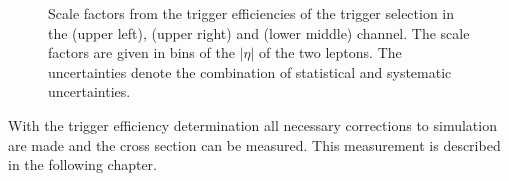 \begin{figure}[htbp!]
\begin{center}
      \caption{Scale factors from the trigger efficiencies of the trigger selection in the \emu (upper left), \mumu (upper right) and \ee (lower middle) channel. The scale factors are given in bins of the $|\eta|$ of the two leptons. The uncertainties denote the combination of statistical and systematic uncertainties.}  
    \label{fig:TrigSF}
  \end{center}
\end{figure}

With the trigger efficiency determination all necessary corrections to simulation are made and the \ttbar cross section can be measured. This measurement is described in the following chapter.






